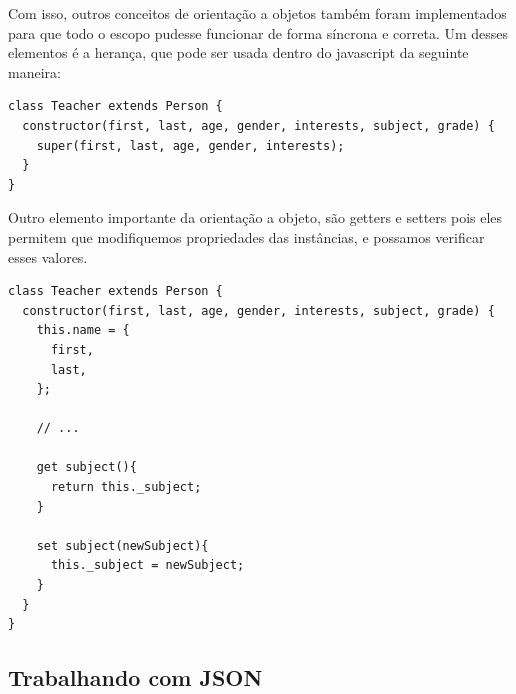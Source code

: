 \documentclass[12pt, a4paper]{paper}
\begin{document}
Com isso, outros conceitos de orientação a objetos também foram implementados para que 
todo o escopo pudesse funcionar de forma síncrona e correta. Um desses elementos é a 
herança, que pode ser usada dentro do javascript da seguinte maneira:

\begin{verbatim}
class Teacher extends Person {
  constructor(first, last, age, gender, interests, subject, grade) {
    super(first, last, age, gender, interests); 
  }
}
\end{verbatim}

Outro elemento importante da orientação a objeto, são getters e setters pois eles 
permitem que modifiquemos propriedades das instâncias, e possamos verificar esses 
valores.

\begin{verbatim}
class Teacher extends Person {
  constructor(first, last, age, gender, interests, subject, grade) {
    this.name = {
      first,
      last,
    };

    // ... 
    
    get subject(){
      return this._subject;
    }

    set subject(newSubject){
      this._subject = newSubject;
    }
  }
}
\end{verbatim}

\subsection{Trabalhando com JSON} %
\label{sub:Trabalhando com JSON}
















\end{document}
